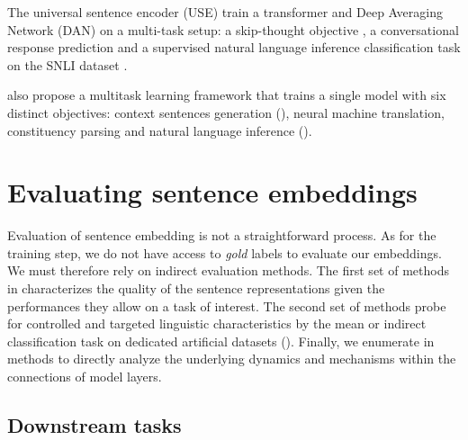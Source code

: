 The universal sentence encoder (USE) \parencite{cer_18} train a transformer and Deep Averaging Network (DAN) on a multi-task setup: a skip-thought objective \parencite{kiros_15}, a conversational response prediction and a supervised natural language inference classification task on the SNLI dataset \parencite{bowman_15, conneau_17}.

\textcite{subramanian_18} also propose a multitask learning framework that trains a single model with six distinct objectives: context sentences generation (), neural machine translation, constituency parsing and natural language inference ().

\section{Evaluating sentence embeddings}

Evaluation of sentence embedding is not a straightforward process. As for the training step, we do not have access to \textit{gold} labels to evaluate our embeddings. We must therefore rely on indirect evaluation methods. The first set of methods in  characterizes the quality of the sentence representations given the performances they allow on a task of interest. The second set of methods probe for controlled and targeted linguistic characteristics by the mean or indirect classification task on dedicated artificial datasets (). Finally, we enumerate in  methods to directly analyze the underlying dynamics and mechanisms within the connections of model layers.

\subsection{Downstream tasks}

